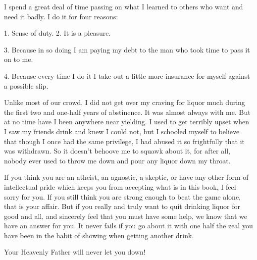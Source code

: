 \begin{biblechapter}
I spend a great deal of time passing on what I learned to others who want and need it badly. I do it for four reasons:

1. Sense of duty.
2. It is a pleasure.

3. Because in so doing I am paying my debt to the man who took time to pass it on to me.

4. Because every time I do it I take out a little more insurance for myself against a possible slip.

Unlike most of our crowd, I did not get over my craving for liquor much during the first two and one-half years of abstinence. It was almost always with me. But at no time have I been anywhere near yielding. I used to get terribly upset when I saw my friends drink and knew I could not, but I schooled myself to believe that though I once had the same privilege, I had abused it so frightfully that it was withdrawn. So it doesn’t behoove me to squawk about it, for after all, nobody ever used to throw me down and pour any liquor down my throat.

If you think you are an atheist, an agnostic, a skeptic, or have any other form of intellectual pride which keeps you from accepting what is in this book, I feel sorry for you. If you still think you are strong enough to beat the game alone, that is your affair. But if you really and truly want to quit drinking liquor for good and all, and sincerely feel that you must have some help, we know that we have an answer for you. It never fails if you go about it with one half the zeal you have been in the habit of showing when getting another drink.

Your Heavenly Father will never let you down!

\end{biblechapter}
